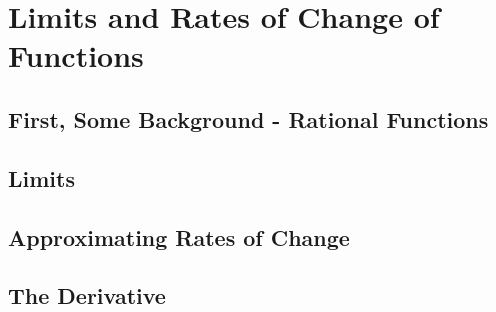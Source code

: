 \documentclass[../precalc.tex]{subfiles}
\begin{document}
\chapter{Limits and Rates of Change of Functions}
\section{First, Some Background - Rational Functions}
\section{Limits}
\section{Approximating Rates of Change}
\section{The Derivative}
\end{document}
